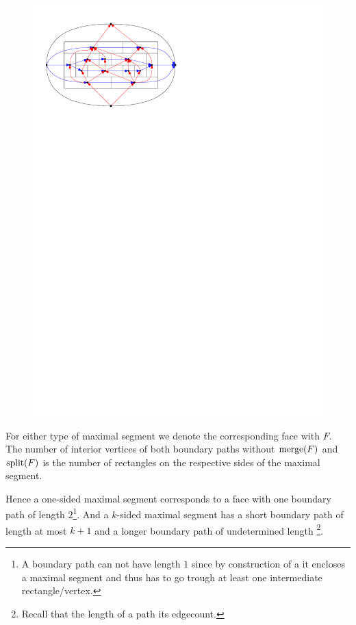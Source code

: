     \begin{figure}[h]
      \centering
      \includegraphics[scale=1]{rectangularDuals/img/relSegmentFaceRescale}
      \caption{}
      \label{fig:rect:relSegmentFace}
    \end{figure}

    For either type of maximal segment we denote the corresponding face with $F$. The number of interior vertices of both boundary paths without $\operatorname{merge}(F)$ and $\operatorname{split}(F)$ is the number of rectangles on the respective sides of the maximal segment.

    Hence a one-sided maximal segment corresponds to a face with one boundary path of length $2$\footnote{A boundary path can not have length $1$ since by construction of a \rel it encloses a maximal segment and thus has to go trough at least one intermediate rectangle/vertex.}. And a $k$-sided maximal segment has a short boundary path of length at most $k+1$ and a longer boundary path of undetermined length \footnote{Recall that the length of a path its edgecount.}.

